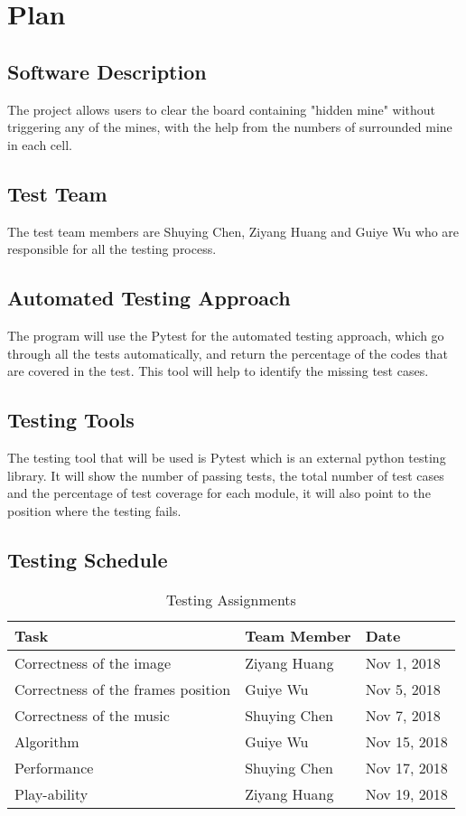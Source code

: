 \documentclass[12pt, titlepage]{article}
\begin{document}
\section{Plan}
\subsection{Software Description}
The project allows users to clear the board containing "hidden mine" without triggering any of the mines, with the help from the numbers of surrounded mine in each cell. 
\subsection{Test Team}
The test team members are Shuying Chen, Ziyang Huang and Guiye Wu who are responsible for all the testing process.
\subsection{Automated Testing Approach}
The program will use the Pytest for the automated testing approach, which go through all the tests automatically, and return the percentage of the codes that are covered in the test. This tool will help to identify the missing test cases.
\subsection{Testing Tools}
The testing tool that will be used is Pytest which is an external python testing library. It will show the number of passing tests, the total number of test cases and the percentage of test coverage for each module, it will also point to the position where the testing fails. 
\subsection{Testing Schedule}
\begin{table}[h!]
    \caption{Testing Assignments}
    \begin{center}
	\begin{tabular}{|p{6cm}|p{3cm}|p{4.0cm}|}
	\hline
	\textbf{Task} & \textbf{Team Member} & \textbf{Date}\\
	\hline
      Correctness of the image & Ziyang Huang &  Nov 1, 2018 \\
      \hline
      Correctness of the frames position & Guiye Wu & Nov 5, 2018\\
      \hline
      Correctness of the music & Shuying Chen & Nov 7, 2018\\
      \hline
      Algorithm & Guiye Wu & Nov 15, 2018\\
      \hline
      Performance & Shuying Chen & Nov 17, 2018\\
      \hline
      Play-ability & Ziyang Huang & Nov 19, 2018\\
      \hline
	\end{tabular}
    \end{center}
	\end{table}
	\newpage
\end{document}
